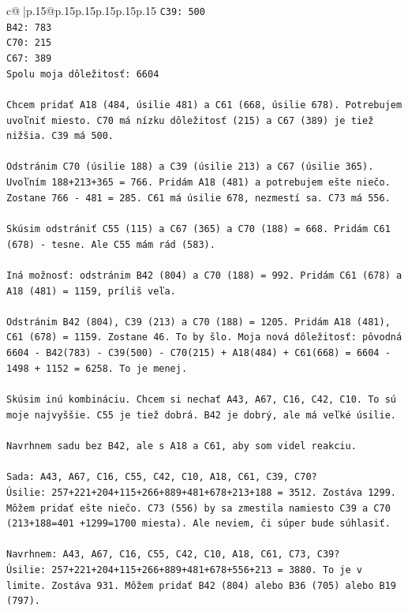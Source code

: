 \documentclass{article}
\begin{document}
{\begin{supertabular}{c@{$\;$}|p{.15\linewidth}@{}p{.15\linewidth}p{.15\linewidth}p{.15\linewidth}p{.15\linewidth}p{.15\linewidth}}
{{{\texttt{C39: 500} \\
\texttt{B42: 783} \\
\texttt{C70: 215} \\
\texttt{C67: 389} \\
\texttt{Spolu moja dôležitosť: 6604} \\
\\ 
\texttt{Chcem pridať A18 (484, úsilie 481) a C61 (668, úsilie 678). Potrebujem uvoľniť miesto. C70 má nízku dôležitosť (215) a C67 (389) je tiež nižšia. C39 má 500.} \\
\\ 
\texttt{Odstránim C70 (úsilie 188) a C39 (úsilie 213) a C67 (úsilie 365). Uvoľním 188+213+365 = 766. Pridám A18 (481) a potrebujem ešte niečo. Zostane 766 {-} 481 = 285. C61 má úsilie 678, nezmestí sa. C73 má 556.} \\
\\ 
\texttt{Skúsim odstrániť C55 (115) a C67 (365) a C70 (188) = 668. Pridám C61 (678) {-} tesne. Ale C55 mám rád (583).} \\
\\ 
\texttt{Iná možnosť: odstránim B42 (804) a C70 (188) = 992. Pridám C61 (678) a A18 (481) = 1159, príliš veľa.} \\
\\ 
\texttt{Odstránim B42 (804), C39 (213) a C70 (188) = 1205. Pridám A18 (481), C61 (678) = 1159. Zostane 46. To by šlo. Moja nová dôležitosť: pôvodná 6604 {-} B42(783) {-} C39(500) {-} C70(215) + A18(484) + C61(668) = 6604 {-} 1498 + 1152 = 6258. To je menej. } \\
\\ 
\texttt{Skúsim inú kombináciu. Chcem si nechať A43, A67, C16, C42, C10. To sú moje najvyššie. C55 je tiež dobrá. B42 je dobrý, ale má veľké úsilie.} \\
\\ 
\texttt{Navrhnem sadu bez B42, ale s A18 a C61, aby som videl reakciu.} \\
\\ 
\texttt{Sada: A43, A67, C16, C55, C42, C10, A18, C61, C39, C70?} \\
\texttt{Úsilie: 257+221+204+115+266+889+481+678+213+188 = 3512. Zostáva 1299. Môžem pridať ešte niečo. C73 (556) by sa zmestila namiesto C39 a C70 (213+188=401 +1299=1700 miesta). Ale neviem, či súper bude súhlasiť.} \\
\\ 
\texttt{Navrhnem: A43, A67, C16, C55, C42, C10, A18, C61, C73, C39? } \\
\texttt{Úsilie: 257+221+204+115+266+889+481+678+556+213 = 3880. To je v limite. Zostáva 931. Môžem pridať B42 (804) alebo B36 (705) alebo B19 (797).} \\
}}}
\end{supertabular}}
\end{document}
